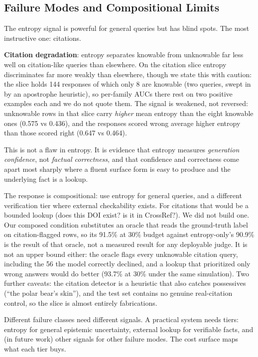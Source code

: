\documentclass[11pt]{article}
\begin{document}
\subsection{Failure Modes and Compositional Limits}\label{sec:eval_bounded}

The entropy signal is powerful for general queries but has blind spots. The most instructive one: citations.

\textbf{Citation degradation}: entropy separates knowable from unknowable far less well on citation-like queries than elsewhere. On the citation slice entropy discriminates far more weakly than elsewhere, though we state this with caution: the slice holds 144 responses of which only 8 are knowable (two queries, swept in by an apostrophe heuristic), so per-family AUCs there rest on two positive examples each and we do not quote them. The signal is weakened, not reversed: unknowable rows in that slice carry \emph{higher} mean entropy than the eight knowable ones (0.575 vs 0.436), and the responses scored wrong average higher entropy than those scored right (0.647 vs 0.464).

This is not a flaw in entropy. It is evidence that entropy measures \emph{generation confidence}, not \emph{factual correctness}, and that confidence and correctness come apart most sharply where a fluent surface form is easy to produce and the underlying fact is a lookup.

The response is compositional: use entropy for general queries, and a different verification tier where external checkability exists. For citations that would be a bounded lookup (does this DOI exist? is it in CrossRef?). We did not build one. Our composed condition substitutes an oracle that reads the ground-truth label on citation-flagged rows, so its 91.5\% at 30\% budget against entropy-only's 90.9\% is the result of that oracle, not a measured result for any deployable judge. It is not an upper bound either: the oracle flags every unknowable citation query, including the 56 the model correctly declined, and a lookup that prioritized only wrong answers would do better (93.7\% at 30\% under the same simulation). Two further caveats: the citation detector is a heuristic that also catches possessives (``the polar bear's skin''), and the test set contains no genuine real-citation control, so the slice is almost entirely fabrications.

Different failure classes need different signals. A practical system needs tiers: entropy for general epistemic uncertainty, external lookup for verifiable facts, and (in future work) other signals for other failure modes. The cost surface maps what each tier buys.
\end{document}
